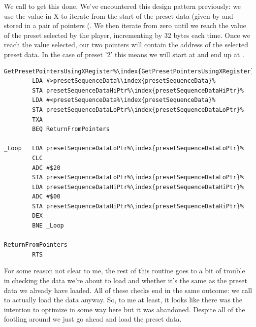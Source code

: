 We call  to get this done. We've encountered this design pattern 
previously: we use the value in X to iterate from the start of the preset data (given by  and stored in a pair of pointers
(. We then iterate from zero until we reach the value of the preset selected by the player, 
incrementing  by 32 bytes each time. Once we reach the value selected, our two pointers will contain the address
of the selected preset data. In the case of preset '2' this means we will start at  and end up at .
\begin{lstlisting}[escapechar=\%]
GetPresetPointersUsingXRegister%\index{GetPresetPointersUsingXRegister}%   
        LDA #>presetSequenceData%\index{presetSequenceData}%
        STA presetSequenceDataHiPtr%\index{presetSequenceDataHiPtr}%
        LDA #<presetSequenceData%\index{presetSequenceData}%
        STA presetSequenceDataLoPtr%\index{presetSequenceDataLoPtr}%
        TXA 
        BEQ ReturnFromPointers

_Loop   LDA presetSequenceDataLoPtr%\index{presetSequenceDataLoPtr}%
        CLC 
        ADC #$20
        STA presetSequenceDataLoPtr%\index{presetSequenceDataLoPtr}%
        LDA presetSequenceDataHiPtr%\index{presetSequenceDataHiPtr}%
        ADC #$00
        STA presetSequenceDataHiPtr%\index{presetSequenceDataHiPtr}%
        DEX 
        BNE _Loop

ReturnFromPointers   
        RTS 
\end{lstlisting}

For some reason not clear to me, the rest of this routine goes to a bit of trouble in checking the data we're about to load and whether it's the same
as the preset data we already have loaded. All of these checks end in the same outcome: we call  to actually load 
the data anyway. So, to me at least, it looks like there was the intention to optimize in some way here but it was abandoned. Despite all of the footling
around we just go ahead and load the preset data.

\clearpage

